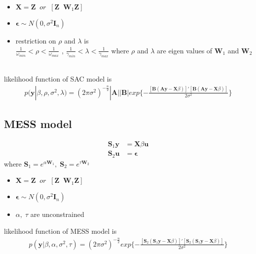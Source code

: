 \documentclass[11pt]{article}
\begin{document}
\begin{itemize}
	\item $\mathbf{X} = \mathbf{Z}\;\; or\;\; [\mathbf{Z} \;\; \mathbf{W}_1 \mathbf{Z}]$
	\item $\boldsymbol{\epsilon} \sim N(0,\sigma^2 \mathbf{I}_n)$
	\item restriction on $\rho$ and $\lambda$ is  \\ $\frac{1}{\omega_{min}} < \rho < \frac{1}{\omega_{max}}$ , $\frac{1}{\gamma_{min}} < \lambda < \frac{1}{\gamma_{max}}$ where $\rho$ and $\lambda$ are eigen values of $\mathbf{W}_1$ and $\mathbf{W}_2$
	\
\end{itemize}
likelihood function of SAC model is
\begin{align}
p(\boldsymbol{y} | \beta , \rho, \sigma^2 , \lambda) = (2\pi \sigma^2)^{-\frac{n}{2}} |\mathbf{A}||\mathbf{B}| exp\{-\frac{[\mathbf{B}(\mathbf{A}\boldsymbol{y} - \mathbf{X} \beta)]'[\mathbf{B}(\mathbf{A}\boldsymbol{y} - \mathbf{X} \beta)]}{2\sigma^2}\}
\end{align}
\subsection{MESS model}
\begin{align}
\mathbf{S}_1 \boldsymbol{y} &= \mathbf{X} \beta \boldsymbol{u} \nonumber \\
\mathbf{S}_2\boldsymbol{u} &= \mathbf{\epsilon} \nonumber
\end{align}
where $\mathbf{S}_1 = e^{\alpha \mathbf{W}_1} , \; \mathbf{S}_2 = e^{\tau \mathbf{W}_2}$
\begin{itemize}
	\item $\mathbf{X} = \mathbf{Z}\;\; or\;\; [\mathbf{Z} \;\; \mathbf{W}_1 \mathbf{Z}]$
	\item $\boldsymbol{\epsilon} \sim N(0,\sigma^2 \mathbf{I}_n)$
	\item $\alpha , \; \tau$ are unconstrained
\end{itemize}
likelihood function of MESS model is
\begin{align}
p(\boldsymbol{y} | \beta , \alpha, \sigma^2 , \tau) = (2\pi \sigma^2)^{-\frac{n}{2}}  exp\{-\frac{[\mathbf{S}_2(\mathbf{S}_1\boldsymbol{y} - \mathbf{X} \beta)]'[\mathbf{S}_2(\mathbf{S}_1\boldsymbol{y} - \mathbf{X} \beta)]}{2\sigma^2}\}
\end{align}
\end{document}
